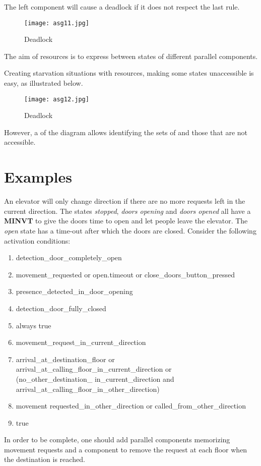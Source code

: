\documentclass[../main.tex]{subfiles}
\begin{document}
\begin{exmp}
The left component will cause a deadlock if it does not respect the last rule.
\begin{figure}[H]
    \centering
    \texttt{[image: asg11.jpg]}
    \caption{Deadlock}
    \label{asg11}
\end{figure}
\end{exmp}
The aim of resources is to express  between states of different parallel components.
\begin{exmp}
Creating starvation situations with resources, making some states unaccessible is easy, as illustrated below.
\begin{figure}[H]
    \centering
    \texttt{[image: asg12.jpg]}
    \caption{Deadlock}
    \label{asg12}
\end{figure}
However, a  of the diagram allows identifying the sets of  and those that are not accessible.
\end{exmp}

\section{Examples}
\begin{exmp}
An elevator will only change direction if there are no more requests left in the current direction. The states \textit{stopped}, \textit{doors opening} and \textit{doors opened} all have a \textbf{MINVT} to give the doors time to open and let people leave the elevator. The \textit{open} state has a time-out after which the doors are closed. Consider the following activation conditions:
\begin{enumerate}
	\item detection\_door\_completely\_open
	\item movement\_requested or open.timeout or close\_doors\_button\_pressed
	\item presence\_detected\_in\_door\_opening
	\item detection\_door\_fully\_closed
	\item always true
	\item movement\_request\_in\_current\_direction
	\item arrival\_at\_destination\_floor or arrival\_at\_calling\_floor\_in\_current\_direction or \\ (no\_other\_destination\_ in\_current\_direction and arrival\_at\_calling\_floor\_in\_other\_direction)
	\item movement requested\_in\_other\_direction or called\_from\_other\_direction
	\item true
\end{enumerate}
In order to be complete, one should add parallel components memorizing movement requests and a component to remove the request at each floor when the destination is reached.
\end{exmp}
\end{document}
